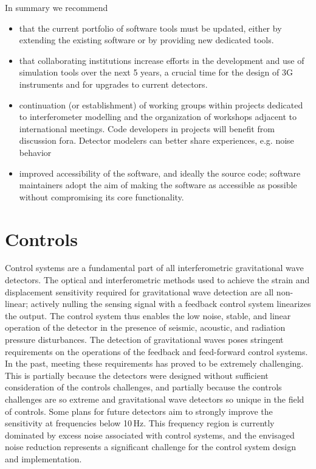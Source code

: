 In summary we recommend
\begin{itemize}
\item that the current portfolio of software tools must be updated, either by extending the existing software or by providing new dedicated tools.  
\item  that collaborating institutions increase efforts in the development and use of simulation tools over the next 5 years, a crucial time for the design of 3G instruments and for upgrades to current detectors.
\item continuation (or establishment) of working groups within projects dedicated to interferometer modelling and the organization of workshops adjacent to international meetings. Code developers in projects will benefit from discussion fora. Detector modelers can better share experiences, e.g. noise behavior
\item  improved accessibility of the software, and ideally the source code;  software maintainers adopt the aim of making the software as accessible as possible without compromising its core functionality. 

\end{itemize}

\section{Controls}
\label{sec:Controls}
Control systems are a fundamental part of all interferometric gravitational wave detectors. The optical and interferometric methods used to achieve the strain and displacement sensitivity required for gravitational wave detection are all non-linear; actively nulling the sensing signal with a feedback control system linearizes the output. 
The control system thus enables the low noise, stable, and linear operation of the detector in the presence of seismic, acoustic, and radiation pressure disturbances.
The detection of gravitational waves poses stringent requirements on the operations of the feedback and feed-forward control systems.
In the past, meeting these requirements has proved to be extremely challenging.
This is partially because the detectors were designed without sufficient consideration of the controls challenges, and partially because the controls challenges are so extreme and gravitational wave detectors so unique in the field of controls.
Some plans for future detectors aim to strongly improve the sensitivity at frequencies below 10\,Hz. This frequency region is currently dominated by excess noise associated with control systems, and the envisaged noise reduction represents a significant challenge for the control system design and implementation.

